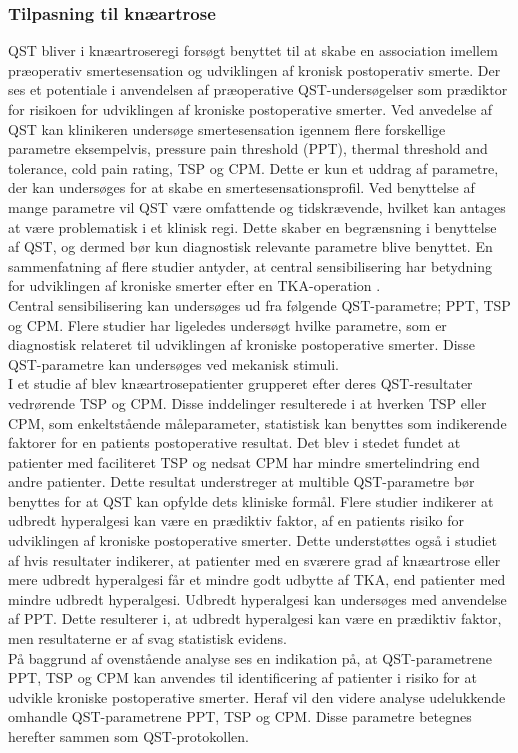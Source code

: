 \subsubsection{Tilpasning til knæartrose}
QST bliver i knæartroseregi forsøgt benyttet til at skabe en association imellem præoperativ smertesensation og udviklingen af kronisk postoperativ smerte. Der ses et potentiale i anvendelsen af præoperative QST-undersøgelser som prædiktor for risikoen for udviklingen af kroniske postoperative smerter. \citep{Wylde2013} Ved anvedelse af QST kan klinikeren undersøge smertesensation igennem flere forskellige parametre eksempelvis, pressure pain threshold (PPT), thermal threshold and tolerance, cold pain rating, TSP og CPM. \citep{Cornelius2015} Dette er kun et uddrag af parametre, der kan undersøges for at skabe en smertesensationsprofil. Ved benyttelse af mange parametre vil QST være omfattende og tidskrævende, hvilket kan antages at være problematisk i et klinisk regi. Dette skaber en begrænsning i benyttelse af QST, og dermed bør kun diagnostisk relevante parametre blive benyttet. \citep{Nielsen2009} En sammenfatning af flere studier antyder, at central sensibilisering har betydning for udviklingen af kroniske smerter efter en TKA-operation \citep{Suokas2012}.\\
Central sensibilisering kan undersøges ud fra følgende QST-parametre; PPT, TSP og CPM. \citep{Arendt-Nielsen2015b} Flere studier har ligeledes undersøgt hvilke parametre, som er diagnostisk relateret til udviklingen af kroniske postoperative smerter. Disse QST-parametre kan undersøges ved mekanisk stimuli. \citep{Petersen2015} \citep{Petersen2016} \citep{Wylde2015b} \\
I et studie af  blev knæartrosepatienter grupperet efter deres QST-resultater vedrørende TSP og CPM. Disse inddelinger resulterede i at hverken TSP eller CPM, som enkeltstående måleparameter, statistisk kan benyttes som indikerende faktorer for en patients postoperative resultat. Det blev i stedet fundet at patienter med faciliteret TSP og nedsat CPM har mindre smertelindring end andre patienter. Dette resultat understreger at multible QST-parametre bør benyttes for at QST kan opfylde dets kliniske formål. \citep{Petersen2016} Flere studier indikerer at udbredt hyperalgesi kan være en prædiktiv faktor, af en patients risiko for udviklingen af kroniske postoperative smerter. \citep{Petersen2016} \citep{Wylde2013} Dette understøttes også i studiet af  hvis resultater indikerer, at patienter med en sværere grad af knæartrose eller mere udbredt hyperalgesi får et mindre godt udbytte af TKA, end patienter med mindre udbredt hyperalgesi. Udbredt hyperalgesi kan undersøges med anvendelse af PPT. Dette resulterer i, at udbredt hyperalgesi kan være en prædiktiv faktor, men resultaterne er af svag statistisk evidens. \citep{Wylde2016c}\\
På baggrund af ovenstående analyse ses en indikation på, at QST-parametrene PPT, TSP og CPM kan anvendes til identificering af patienter i risiko for at udvikle kroniske postoperative smerter. Heraf vil den videre analyse udelukkende omhandle QST-parametrene PPT, TSP og CPM. Disse parametre betegnes herefter sammen som QST-protokollen. 

